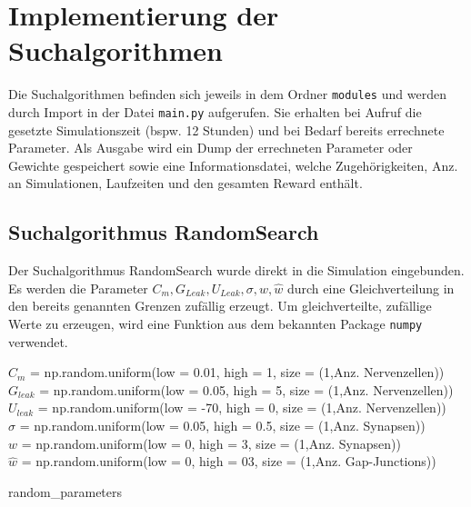 	
		
\section{Implementierung der Suchalgorithmen}
\label{sec:imp_search}
	Die Suchalgorithmen befinden sich jeweils in dem Ordner \texttt{modules} und werden durch Import in der Datei \texttt{main.py} aufgerufen. Sie erhalten bei Aufruf die gesetzte Simulationszeit (bspw. 12 Stunden) und bei Bedarf bereits errechnete Parameter. Als Ausgabe wird ein Dump der errechneten Parameter oder Gewichte gespeichert sowie eine Informationsdatei, welche Zugehörigkeiten, Anz. an Simulationen, Laufzeiten und den gesamten Reward enthält.
	
	\subsection{Suchalgorithmus RandomSearch}
		Der Suchalgorithmus RandomSearch wurde direkt in die Simulation eingebunden. Es werden die Parameter $C_m, G_{Leak}, U_{Leak}, \sigma, w, \hat{w}$ durch eine Gleichverteilung in den bereits genannten Grenzen zufällig erzeugt. Um gleichverteilte, zufällige Werte zu erzeugen, wird eine Funktion aus dem bekannten Package \texttt{numpy} verwendet.
		\begin{algorithm}
			
				$C_m$ = np.random.uniform(low = 0.01, high = 1, size = (1,Anz. Nervenzellen))\\
				$G_{leak}$ = np.random.uniform(low = 0.05, high = 5, size = (1,Anz. Nervenzellen))\\
				$U_{leak}$ = np.random.uniform(low = -70, high = 0, size = (1,Anz. Nervenzellen))\\
				$\sigma$ = np.random.uniform(low = 0.05, high = 0.5, size = (1,Anz. Synapsen))\\
				$w$ = np.random.uniform(low = 0, high = 3, size = (1,Anz. Synapsen))\\
				$\hat{w}$ = np.random.uniform(low = 0, high = 03, size = (1,Anz. Gap-Junctions))
			\caption{random\_parameters}
		\end{algorithm}
